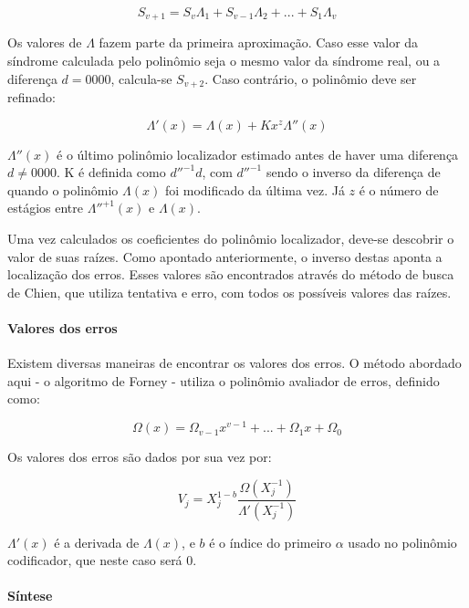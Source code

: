 	\begin{equation}
	S_{v + 1} = S_{v}\Lambda_{1} + S_{v-1}\Lambda_{2} + ... + S_{1}\Lambda_{v}
	\end{equation}

	Os valores de $\Lambda$ fazem parte da primeira aproximação. Caso esse valor da síndrome calculada pelo polinômio seja o mesmo valor da síndrome real, ou a diferença $d = 0000$, calcula-se $S_{v + 2}$. Caso contrário, o polinômio deve ser refinado:

	\begin{equation}
	\Lambda'(x) = \Lambda(x) +  Kx^{z}\Lambda''(x)
	\end{equation}

	$\Lambda''(x)$ é o último polinômio localizador estimado antes de haver uma diferença $d \neq 0000$. K é definida como $d''^{-1}d$, com $d''^{-1}$ sendo o inverso da diferença de quando o polinômio $\Lambda(x)$ foi modificado da última vez. Já $z$ é o número de estágios entre $\Lambda''^{+1}(x)$ e $\Lambda(x)$.

	Uma vez calculados os coeficientes do polinômio localizador,
	deve-se descobrir o valor de suas raízes. Como apontado anteriormente, o inverso destas aponta a localização dos erros. Esses valores são encontrados através do método de busca de Chien, que utiliza tentativa e erro, com todos os possíveis valores das raízes.

	\paragraph*{Valores dos erros}

	Existem diversas maneiras de encontrar os valores dos erros. O método abordado aqui - o algoritmo de Forney - utiliza o polinômio avaliador de erros, definido como:

	\begin{equation}
	\Omega(x) = \Omega_{v-1}x^{v-1} + ... + \Omega_{1}x + \Omega_{0}
	\end{equation}

	Os valores dos erros são dados por sua vez por:

	\begin{equation}
	V_{j} = X_{j}^{1-b} \frac{\Omega(X_{j}^{-1})}{\Lambda'(X_{j}^{-1})}
	\end{equation}

	$\Lambda'(x)$ é a derivada de $\Lambda(x)$, e $b$ é o índice do primeiro $\alpha$ usado no polinômio codificador, que neste caso será 0.

	\paragraph*{Síntese}

